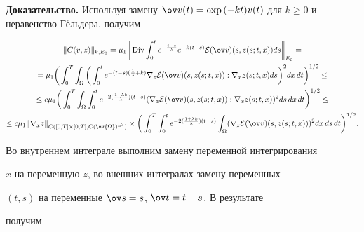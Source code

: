 {\bf Доказательство.} Используя замену $\ov v (t)=\exp{(-kt)}v


(t)$ для $k\ge0$ и неравенство Г\"ельдера, получим


\begin{gather*}


\|C(v,z)\|_{k,E_0}=\mu_1 \bigg\| \Div \intl{0}{t}


e^{-\frac {t-s} {\lb}} e^{-k(t-s)} \E(\ov v)(s,z(s;t,x))ds


\bigg\|_{E_0}=\\


%


=\mu_1 \bigg(\intl{0}{T} \intl{\Om}{} \bigg(\intl{0}{t} e^{-(t-


s)(\frac{1}{\lambda}


+k)}\nabla_z {\E(\ov v)} (s,z(s;t,x)): \nabla_x z(s;t,x)ds\bigg)^2


dx\,dt\bigg)^{1/2} \le\\


%


\le c \mu_1 \bigg(\intl{0}{T} \intl{\Om}{} \intl{0}{t}


e^{-2(\frac{1+\lambda k}{\lambda})(t-s)}(\nabla_z {\E(\ov


v)}(s,z(s;t,x)): \nabla_x z(s;t,x))^2ds\,


dx\,dt\bigg)^{1/2}\le\\


%


\le c \mu_1 \|\nabla_x z\|_{C([0,T]\times [0,T],


C(\ov{\Om})^{n^2})} \times \bigg(\intl{0}{T}\intl{0}{t}


e^{-2(\frac{1+\lambda k}{\lambda})(t -


s)}\intl{\Om}{}(\nabla_z {\E(\ov v)}


(s,z(s;t,x)))^2dx\, ds \,dt\bigg)^{1/2}.


\end{gather*}


Во внутреннем интеграле выполним замену переменной интегрирования


$x$ на переменную $z$, во внешних интегралах замену переменных


$(t,s)$ на переменные $\ov s=s$, $\ov t=t-s$. В результате


получим


